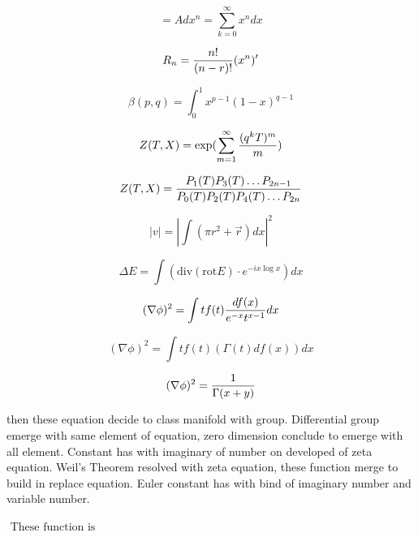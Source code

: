 \documentclass{jsarticle}
\begin{document}
\begin{equation}
   [x] = A 
  dx^n = \sum^\infty_{k=0} x^n dx 
\end{equation}

\begin{equation}
   R_{n} = {n! \over (n - r)!} (x^n)' 
\end{equation}

\begin{equation}
   \beta (p,q) = \int^1_0 x^{p-1} (1 - x)^{q-1} 
\end{equation}

\begin{equation}
   Z(T,X) = \mathrm{exp} (\sum^\infty_{m=1}{(q^k T)^m \over m}) 
\end{equation}

\begin{equation}
   Z(T,X) = {P_{1}(T) P_{3}(T) \dots P_{2n-1} \over  
	P_{0}(T) P_{2}(T) P_{4}(T) \dots P_{2n}} 
\end{equation}

\begin{equation}
   |v| = |\int (\pi r^2 + \vec{r})dx|^2 
\end{equation}

\begin{equation}
   \Delta E = \int (\mathrm{div} (\mathrm{rot} E) \cdot e^{-ix \log x}) dx 
\end{equation}


\begin{equation}
   (\nabla \phi)^2 = \int tf(t){df(x) \over e^{-x} t^{x - 1}} dx 
\end{equation}

\begin{equation}
   (\nabla \phi)^2 = \int tf(t)(\Gamma(t)df(x)) dx 
\end{equation}

\begin{equation}
   (\nabla \phi)^2 = {1 \over \Gamma(x + y)} 
\end{equation}

   then these equation decide to class manifold with group.
  Differential group emerge with same element of equation, zero dimension conclude to emerge with all element.
  Constant has with imaginary of number on developed of zeta equation. Weil's Theorem resolved with zeta equation,
these function merge to build in replace equation. Euler constant has with bind of imaginary number and variable 
number.

$\text{	These function is}$
\end{document}

